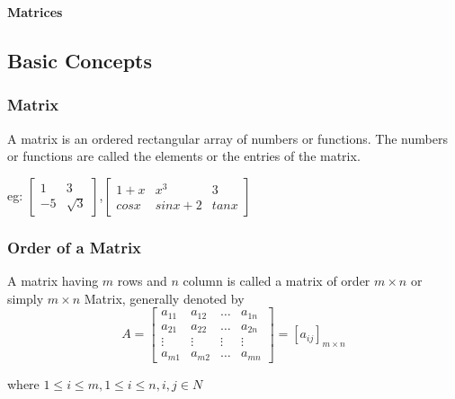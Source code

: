 \documentclass[12pt]{article}
\begin{document}
\begin{center}
    {\LARGE \textbf{Matrices} }
\end{center}


    \subsection*{Basic Concepts}
\subsubsection*{Matrix}
A matrix is an ordered rectangular array of numbers or functions. The numbers or functions are called the elements or the entries of the matrix.

eg:
$\begin{bmatrix}
    1 & 3\\
    -5  & \sqrt{3}
    \end{bmatrix}$,$\begin{bmatrix}
        1+x & x^3 & 3\\
        cos x & sin x +2 & tan x
        \end{bmatrix}$

    \subsubsection*{Order of a Matrix}
    A matrix having $m$ rows and $n$ column is called a matrix of order $m \times n$ or simply $m \times n$ Matrix, generally denoted by 
    $$A=\begin{bmatrix}
        a_{11} & a_{12} & \dots & a_{1n}\\
        a_{21} & a_{22} & \dots & a_{2n}\\
        \vdots & \vdots & \vdots & \vdots \\
        a_{m1} & a_{m2} & \dots & a_{mn}
        \end{bmatrix}=[a_{ij}]_{m \times n}$$

        where $1 \leq i \leq m,1 \leq i \leq n , i,j \in N$
\end{document}
